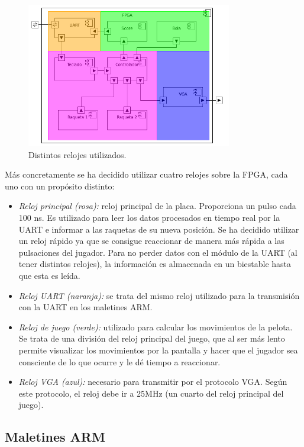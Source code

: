 \begin{figure}[h]
  \centering
  \includegraphics[width=0.8\textwidth]{images/fpga_componentes_timing_v2.png}
  \caption{Distintos relojes utilizados.}
  \label{s3:fig:componentes-fpga-clocking}
\end{figure}


Más concretamente se ha decidido utilizar cuatro relojes sobre la FPGA,
cada uno con un propósito distinto:
\begin{itemize}
\item \emph{Reloj principal (rosa):} reloj principal de la
  placa. Proporciona un pulso cada 100 ns. Es utilizado para leer los datos
  procesados en tiempo real por la UART e informar a las raquetas de su
  nueva posición. Se ha decidido utilizar un reloj rápido ya que se
  consigue reaccionar de manera más rápida a las pulsaciones del
  jugador. Para no perder datos con el módulo de la UART (al tener
  distintos relojes), la información es almacenada en un biestable hasta
  que esta es leída.
\item \emph{Reloj UART (naranja):} se trata del mismo reloj utilizado para
  la transmisión con la UART en los maletines ARM.
\item \emph{Reloj de juego (verde):} utilizado para calcular los
  movimientos de la pelota. Se trata de una división del reloj principal
  del juego, que al ser más lento permite visualizar los movimientos por la
  pantalla y hacer que el jugador sea consciente de lo que ocurre y le dé
  tiempo a reaccionar.
\item \emph{Reloj VGA (azul):} necesario para transmitir por el
  protocolo VGA. Según este protocolo, el reloj debe ir a 25MHz (un cuarto
  del reloj principal del juego).
\end{itemize}

\subsection{Maletines ARM}
\label{s3:subsec:maletines}

